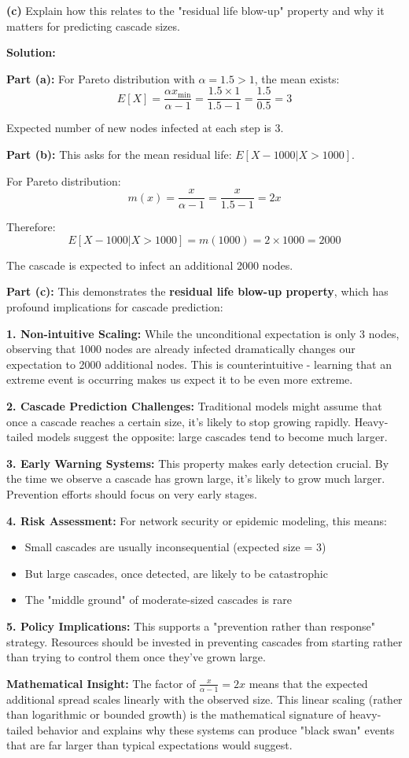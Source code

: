 \documentclass[11pt]{article}
\newenvironment{solution}
{\color{solutioncolor}\begin{framed}\textbf{Solution:}\par}
{\end{framed}}
\begin{document}
\textbf{(c)} Explain how this relates to the "residual life blow-up" property and why it matters for predicting cascade sizes.

\begin{solution}
\textbf{Part (a):}
For Pareto distribution with $\alpha = 1.5 > 1$, the mean exists:
$$E[X] = \frac{\alpha x_{\min}}{\alpha - 1} = \frac{1.5 \times 1}{1.5 - 1} = \frac{1.5}{0.5} = 3$$

Expected number of new nodes infected at each step is 3.

\textbf{Part (b):}
This asks for the mean residual life: $E[X - 1000 | X > 1000]$.

For Pareto distribution:
$$m(x) = \frac{x}{\alpha - 1} = \frac{x}{1.5 - 1} = 2x$$

Therefore:
$$E[X - 1000 | X > 1000] = m(1000) = 2 \times 1000 = 2000$$

The cascade is expected to infect an additional 2000 nodes.

\textbf{Part (c):}
This demonstrates the \textbf{residual life blow-up property}, which has profound implications for cascade prediction:

\textbf{1. Non-intuitive Scaling:}
While the unconditional expectation is only 3 nodes, observing that 1000 nodes are already infected dramatically changes our expectation to 2000 additional nodes. This is counterintuitive - learning that an extreme event is occurring makes us expect it to be even more extreme.

\textbf{2. Cascade Prediction Challenges:}
Traditional models might assume that once a cascade reaches a certain size, it's likely to stop growing rapidly. Heavy-tailed models suggest the opposite: large cascades tend to become much larger.

\textbf{3. Early Warning Systems:}
This property makes early detection crucial. By the time we observe a cascade has grown large, it's likely to grow much larger. Prevention efforts should focus on very early stages.

\textbf{4. Risk Assessment:}
For network security or epidemic modeling, this means:
\begin{itemize}
\item Small cascades are usually inconsequential (expected size = 3)
\item But large cascades, once detected, are likely to be catastrophic
\item The "middle ground" of moderate-sized cascades is rare
\end{itemize}

\textbf{5. Policy Implications:}
This supports a "prevention rather than response" strategy. Resources should be invested in preventing cascades from starting rather than trying to control them once they've grown large.

\textbf{Mathematical Insight:}
The factor of $\frac{x}{\alpha-1} = 2x$ means that the expected additional spread scales linearly with the observed size. This linear scaling (rather than logarithmic or bounded growth) is the mathematical signature of heavy-tailed behavior and explains why these systems can produce "black swan" events that are far larger than typical expectations would suggest.
\end{solution}
\end{document}
